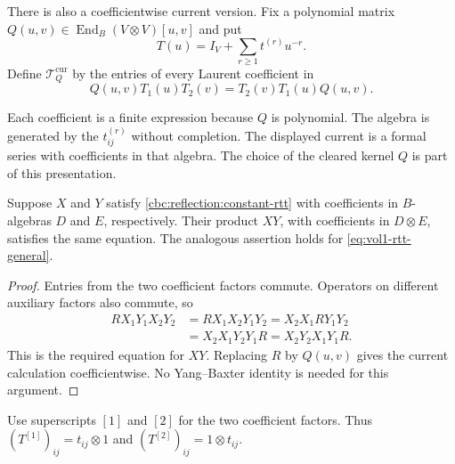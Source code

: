 There is also a coefficientwise current version.  Fix a polynomial matrix
$Q(u,v)\in\operatorname{End}_B(V\otimes V)[u,v]$ and put
\[
 T(u)=I_V+\sum_{r\geq1}t^{(r)}u^{-r}.
\]
Define $\mathcal T_Q^{\mathrm{cur}}$ by the entries of every Laurent
coefficient in
\begin{equation}\label{eq:vol1-rtt-general}
 Q(u,v)T_1(u)T_2(v)=T_2(v)T_1(u)Q(u,v).
\end{equation}

Each coefficient is a finite expression because $Q$ is polynomial.
The algebra is generated by the $t_{ij}^{(r)}$ without completion.
The displayed current is a formal series with coefficients in that algebra.
The choice of the cleared kernel $Q$ is part of this presentation.

\begin{lemma}\label{cbc:reflection:product}
Suppose $X$ and $Y$ satisfy \eqref{cbc:reflection:constant-rtt} with
coefficients in $B$-algebras $D$ and $E$, respectively.
Their product $XY$, with coefficients in $D\otimes E$, satisfies the same
equation.  The analogous assertion holds for
\eqref{eq:vol1-rtt-general}.
\end{lemma}
\begin{proof}
Entries from the two coefficient factors commute.  Operators on different
auxiliary factors also commute, so
\[
 \begin{aligned}
 R X_1Y_1X_2Y_2
 &=R X_1X_2Y_1Y_2
  =X_2X_1R Y_1Y_2\\
 &=X_2X_1Y_2Y_1R
  =X_2Y_2X_1Y_1R.
 \end{aligned}
\]
This is the required equation for $XY$.
Replacing $R$ by $Q(u,v)$ gives the current calculation coefficientwise.
No Yang--Baxter identity is needed for this argument.
\end{proof}

Use superscripts $[1]$ and $[2]$ for the two coefficient factors.
Thus $(T^{[1]})_{ij}=t_{ij}\otimes1$ and
$(T^{[2]})_{ij}=1\otimes t_{ij}$.

